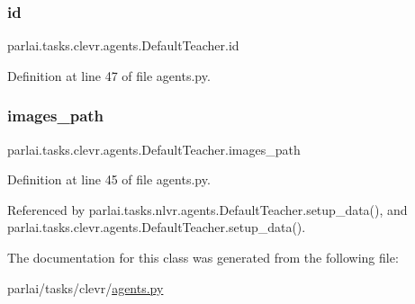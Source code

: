 \subsubsection{\texorpdfstring{id}{id}}
{\footnotesize\ttfamily parlai.\+tasks.\+clevr.\+agents.\+Default\+Teacher.\+id}



Definition at line 47 of file agents.\+py.

\mbox{\label{classparlai_1_1tasks_1_1clevr_1_1agents_1_1DefaultTeacher_a524bed88c209582a3ccdc7693ba08214}} 
\subsubsection{\texorpdfstring{images\+\_\+path}{images\_path}}
{\footnotesize\ttfamily parlai.\+tasks.\+clevr.\+agents.\+Default\+Teacher.\+images\+\_\+path}



Definition at line 45 of file agents.\+py.



Referenced by parlai.\+tasks.\+nlvr.\+agents.\+Default\+Teacher.\+setup\+\_\+data(), and parlai.\+tasks.\+clevr.\+agents.\+Default\+Teacher.\+setup\+\_\+data().



The documentation for this class was generated from the following file\+:\begin{DoxyCompactItemize}
\item 
parlai/tasks/clevr/\hyperlink{parlai_2tasks_2clevr_2agents_8py}{agents.\+py}\end{DoxyCompactItemize}
